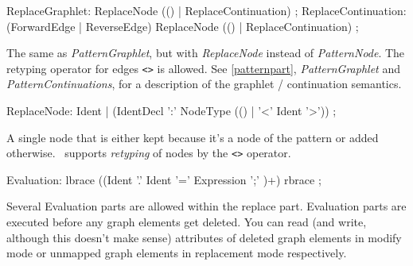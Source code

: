 \begin{rail}
  ReplaceGraphlet: ReplaceNode (() | ReplaceContinuation) ;
  ReplaceContinuation:  (ForwardEdge | ReverseEdge) ReplaceNode (() | ReplaceContinuation) ;    
\end{rail}
The same as \emph{PatternGraphlet}, but with \emph{ReplaceNode} instead of \emph{PatternNode}. The retyping operator for edges \texttt{<>} is allowed. See \ref{patternpart}, \emph{PatternGraphlet} and \emph{PatternContinuations}, for a description of the graphlet / continuation semantics.

\begin{rail}
  ReplaceNode: Ident | 
    (IdentDecl ':' NodeType (() | '<' Ident '>')) ;
\end{rail}
A single node that is either kept because it's a node of the pattern or added otherwise. \GrG\ supports \emph{retyping} of nodes by the \texttt{<>} operator.


\begin{rail}    
   Evaluation: lbrace ((Ident '.' Ident '=' Expression ';' )+) rbrace ;
\end{rail}
Several Evaluation parts are allowed within the replace part. Evaluation parts are executed before any graph elements get deleted. You can read (and write, although this doesn't make sense) attributes of deleted graph elements in modify mode or unmapped graph elements in replacement mode respectively.
